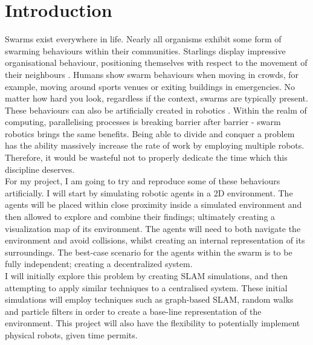 \documentclass[12pt]{article}
\begin{document}
\section{Introduction}
Swarms exist everywhere in life. Nearly all organisms exhibit some form of swarming behaviours within their
communities. Starlings display impressive organisational behaviour, positioning themselves with respect to the
movement of their neighbours \cite{starling_swarm}. Humans show swarm behaviours when moving in crowds, for example, moving around sports
venues or exiting buildings in emergencies. No matter how hard you look, regardless if the context, swarms are
typically present.\\
These behaviours can also be artificially created in robotics \cite{intro_to_swarm}. Within the realm of computing, parallelising
processes is breaking barrier after barrier - swarm robotics brings the same benefits. Being able to divide and
conquer a problem has the ability massively increase the rate of work by employing multiple robots. Therefore, it
would be wasteful not to properly dedicate the time which this discipline deserves.\\
For my project, I am going to try and reproduce some of these behaviours artificially. I will start by simulating robotic
agents in a 2D environment. The agents will be placed within close proximity inside a simulated environment and then allowed
to explore and combine their findings; ultimately creating a visualization map of its environment. The agents will need to
both navigate the environment and avoid collisions, whilst creating an internal representation of its surroundings. The
best-case scenario for the agents within the swarm is to be fully independent; creating a decentralized system.\\
I will initially explore this problem by creating SLAM simulations, and then attempting to apply similar techniques
to a centralised system. These initial simulations will employ techniques such as graph-based SLAM, random walks and particle
filters in order to create a base-line representation of the environment. This project will also have the flexibility to
potentially implement physical robots, given time permits.\\

\end{document}
